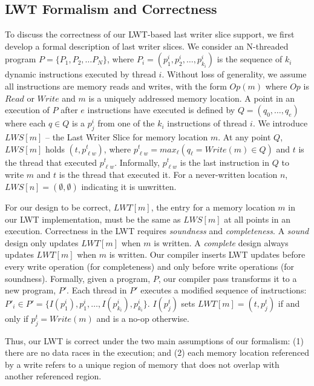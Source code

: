 \documentclass[preprint,9pt]{sigplanconf}
\newcommand{\lwt}{LWT\xspace}
\begin{document}
\subsection{\lwt Formalism and Correctness}
\label{sec:lwssoundness}
To discuss the correctness of our \lwt-based last writer slice support, we
first develop a formal description of last writer slices.  We consider an
N-threaded program $P = \{P_1, P_2, \ldots P_N\}$, where $P_i = (p^{i}_{1},
p^{i}_{2}, \ldots, p^{i}_{k_{i}})$ is the sequence of $k_{i}$ dynamic
instructions executed by thread $i$.  Without loss of generality, we assume all
instructions are memory reads and writes, with the form $Op(m)$ where $Op$ is
$Read$ or $Write$ and $m$ is a uniquely addressed memory location.
A point in an execution of $P$ after $e$ instructions have
executed is defined by $Q = (q_{0}, \ldots, q_{e})$ where each $q \in Q$ is a
$p^{i}_{j}$ from one of the $k_i$ instructions of thread $i$.  We introduce
$LWS[m]$ -- the Last Writer Slice for memory location $m$.   At any point $Q$,
$LWS[m]$ holds $(t,p^{t}_{\ell w})$, where $p^{t}_{\ell w} = max_{\ell}( 
q_{\ell} = Write(m) \in Q)$ and $t$ is the thread that
executed $p^{t}_{\ell w}$. Informally, $p^{t}_{\ell w}$ is the last instruction
in $Q$ to write $m$ and $t$ is the thread that executed it.  For a
never-written location $n$, $LWS[n] = (\emptyset,\emptyset)$ indicating it is
unwritten.

For our design to be correct, $LWT[m]$, the entry for a memory location $m$ in
our \lwt implementation, must be the same as $LWS[m]$ at all points in an
execution.  Correctness in the \lwt requires {\em soundness} and {\em
completeness}.  A {\em sound} design only updates $LWT[m]$ when $m$ is
written.  A {\em complete} design always updates $LWT[m]$ when $m$ is written.
Our compiler inserts \lwt updates before every write
operation (for completeness) and only before write operations (for soundness).
Formally, given a program, $P$, our compiler pass transforms it to a new
program, $P'$.  Each thread in $P'$ executes a modified sequence of
instructions: $P'_{i} \in P' = \{ I(p^{i}_{1}), p^{i}_{1}, \ldots,
I(p^{i}_{k_{i}}), p^{i}_{k_{i}} \}$.  $I(p^{t}_{j})$ sets $LWT[m] =
(t,p^{t}_{j})$ if and only if $p^{t}_{j} = Write(m)$ and is a no-op otherwise.

Thus, our \lwt is correct under the two main assumptions of our formalism: (1)
there are no data races in the execution; and (2) each memory location
referenced by a write refers to a unique region of memory that does not overlap
with another referenced region.  
\end{document}
